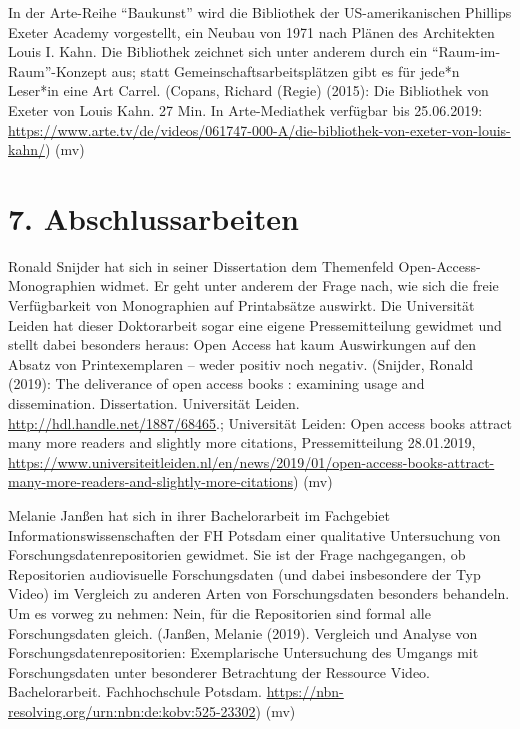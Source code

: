 \documentclass[a4paper,
fontsize=11pt,
oneside,
numbers=noperiodatend,
parskip=half-,
bibliography=totoc,
final
]{scrartcl}
\begin{document}
In der Arte-Reihe \enquote{Baukunst} wird die Bibliothek der
US-amerikanischen Phillips Exeter Academy vorgestellt, ein Neubau von
1971 nach Plänen des Architekten Louis I. Kahn. Die Bibliothek zeichnet
sich unter anderem durch ein \enquote{Raum-im-Raum}-Konzept aus; statt
Gemeinschaftsarbeitsplätzen gibt es für jede*n Leser*in eine Art Carrel.
(Copans, Richard (Regie) (2015): Die Bibliothek von Exeter von Louis
Kahn. 27 Min. In Arte-Mediathek verfügbar bis 25.06.2019:
\url{https://www.arte.tv/de/videos/061747-000-A/die-bibliothek-von-exeter-von-louis-kahn/})
(mv)

\hypertarget{abschlussarbeiten}{%
\section{7. Abschlussarbeiten}\label{abschlussarbeiten}}

Ronald Snijder hat sich in seiner Dissertation dem Themenfeld
Open-Access-Monographien widmet. Er geht unter anderem der Frage nach,
wie sich die freie Verfügbarkeit von Monographien auf Printabsätze
auswirkt. Die Universität Leiden hat dieser Doktorarbeit sogar eine
eigene Pressemitteilung gewidmet und stellt dabei besonders heraus: Open
Access hat kaum Auswirkungen auf den Absatz von Printexemplaren -- weder
positiv noch negativ. (Snijder, Ronald (2019): The deliverance of open
access books : examining usage and dissemination. Dissertation.
Universität Leiden. \url{http://hdl.handle.net/1887/68465}.; Universität
Leiden: Open access books attract many more readers and slightly more
citations, Pressemitteilung 28.01.2019,
\url{https://www.universiteitleiden.nl/en/news/2019/01/open-access-books-attract-many-more-readers-and-slightly-more-citations})
(mv)

Melanie Janßen hat sich in ihrer Bachelorarbeit im Fachgebiet
Informationswissenschaften der FH Potsdam einer qualitative Untersuchung
von Forschungsdatenrepositorien gewidmet. Sie ist der Frage
nachgegangen, ob Repositorien audiovisuelle Forschungsdaten (und dabei
insbesondere der Typ Video) im Vergleich zu anderen Arten von
Forschungsdaten besonders behandeln. Um es vorweg zu nehmen: Nein, für
die Repositorien sind formal alle Forschungsdaten gleich. (Janßen,
Melanie (2019). Vergleich und Analyse von Forschungsdatenrepositorien:
Exemplarische Untersuchung des Umgangs mit Forschungsdaten unter
besonderer Betrachtung der Ressource Video. Bachelorarbeit.
Fachhochschule Potsdam.
\url{https://nbn-resolving.org/urn:nbn:de:kobv:525-23302}) (mv)
\end{document}
